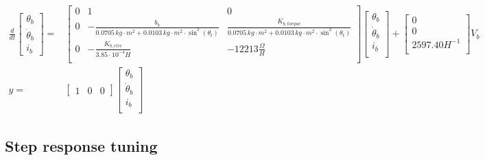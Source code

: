 \documentclass[../../main]{subfiles}
\begin{document}
\begin{equation}
      \label{eq:Theoretical_models_bottom}
      \begin{split}
      \frac{d}{dt}
          \begin{bmatrix}
              \theta_b        \\
              \dot \theta_b   \\
              i_b
          \end{bmatrix}
        =&
          \begin{bmatrix}
              0 & 1                         & 0                         \\
              0 & -\frac{b_b}{0.0705\si{\,kg\cdot m^2} + 0.0103 \si{\,kg\cdot m^2}\cdot \sin^2(\theta_t)} & \frac{K_{b,torque}}{0.0705\si{\,kg\cdot m^2} + 0.0103 \si{\,kg\cdot m^2}\cdot \sin^2(\theta_t)}  \\
              0 & -\frac{K_{b,elec}}{3.85\cdot 10^{-4}\si{H}}   & -12213 \si{\frac{\Omega}{H}}          \\
          \end{bmatrix}
    \begin{bmatrix}
        \theta_b        \\
        \dot \theta_b   \\
        i_b             \\
    \end{bmatrix}
        +
    \begin{bmatrix}
        0             \\
        0             \\
        2597.40 \si{H^{-1}} \\
    \end{bmatrix}
    V_b
\\
      y =&
    \begin{bmatrix}
        1 & 0 & 0
    \end{bmatrix}
    \begin{bmatrix}
        \theta_b \\
        \dot \theta_b\\
        i_b\\
    \end{bmatrix}
  \end{split}
\end{equation}
\subsection{Step response tuning}
\label{ch:stepresponse_tuning}

\end{document}
